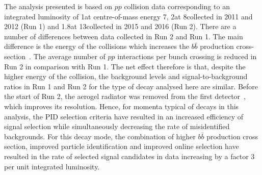 The analysis presented is based on $pp$ collision data corresponding to an integrated luminosity of 1\invfb at centre-of-mass energy 7\tev, 2\invfb at 8\tev collected in 2011 and 2012 (Run 1) and 1.8\invfb at 13\tev collected in 2015 and 2016 (Run 2). There are a number of differences between data collected in Run 2 and Run 1. The main difference is the energy of the collisions which increases the $b\bar{b}$ production cross-section~\cite{LHCb-PAPER-2015-037}. The average number of $pp$ interactions per bunch crossing is reduced in Run 2 in comparison with Run 1. The net effect therefore is that, despite the higher energy of the collision, the background levels and signal-to-background ratios in Run 1 and Run 2 for the type of decay analysed here are similar. Before the start of Run 2, the aerogel radiator was removed from the first \rich detector~\cite{LHCb-DP-2012-003}, which improves its resolution. Hence, for momenta typical of decays in this analysis, the PID selection criteria have resulted in an increased efficiency of signal selection while simultaneously decreasing the rate of misidentified backgrounds. For this decay mode, the combination of higher $b\bar{b}$ production cross section, improved particle identification and improved online selection have resulted in the rate of selected signal candidates in data increasing by a factor 3 per unit integrated luminosity.
